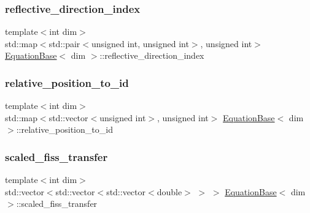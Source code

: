 \subsubsection{\texorpdfstring{reflective\+\_\+direction\+\_\+index}{reflective\_direction\_index}}
{\footnotesize\ttfamily template$<$int dim$>$ \\
std\+::map$<$std\+::pair$<$unsigned int, unsigned int$>$, unsigned int$>$ \hyperlink{class_equation_base}{Equation\+Base}$<$ dim $>$\+::reflective\+\_\+direction\+\_\+index\hspace{0.3cm}{\ttfamily [protected]}}

\mbox{\label{class_equation_base_a53b48062132ee777856a3b340b4000b2}} 
\subsubsection{\texorpdfstring{relative\+\_\+position\+\_\+to\+\_\+id}{relative\_position\_to\_id}}
{\footnotesize\ttfamily template$<$int dim$>$ \\
std\+::map$<$std\+::vector$<$unsigned int$>$, unsigned int$>$ \hyperlink{class_equation_base}{Equation\+Base}$<$ dim $>$\+::relative\+\_\+position\+\_\+to\+\_\+id\hspace{0.3cm}{\ttfamily [protected]}}

\mbox{\label{class_equation_base_aadf1651f816a1a65301faac3cd075aeb}} 
\subsubsection{\texorpdfstring{scaled\+\_\+fiss\+\_\+transfer}{scaled\_fiss\_transfer}}
{\footnotesize\ttfamily template$<$int dim$>$ \\
std\+::vector$<$std\+::vector$<$std\+::vector$<$double$>$ $>$ $>$ \hyperlink{class_equation_base}{Equation\+Base}$<$ dim $>$\+::scaled\+\_\+fiss\+\_\+transfer\hspace{0.3cm}{\ttfamily [protected]}}

